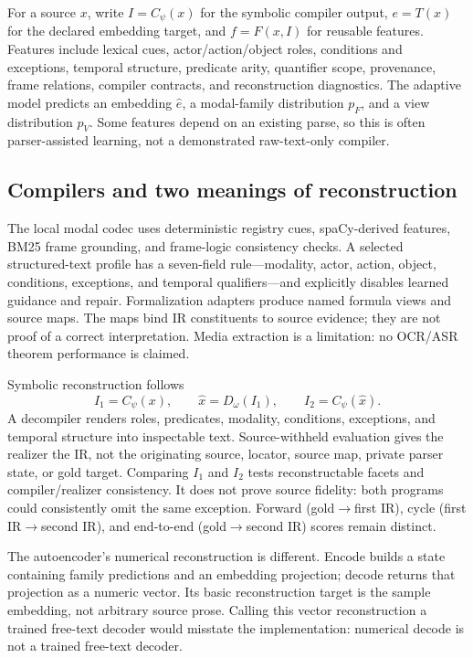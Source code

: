 \documentclass{article}
\begin{document}
For a source $x$, write $I=C_\psi(x)$ for the symbolic compiler output, $e=T(x)$ for the declared embedding target, and $f=F(x,I)$ for reusable features. Features include lexical cues, actor/action/object roles, conditions and exceptions, temporal structure, predicate arity, quantifier scope, provenance, frame relations, compiler contracts, and reconstruction diagnostics. The adaptive model predicts an embedding $\hat e$, a modal-family distribution $p_F$, and a view distribution $p_V$. Some features depend on an existing parse, so this is often parser-assisted learning, not a demonstrated raw-text-only compiler.

\subsection{Compilers and two meanings of reconstruction}
The local modal codec uses deterministic registry cues, spaCy-derived features, BM25 frame grounding, and frame-logic consistency checks. A selected structured-text profile has a seven-field rule---modality, actor, action, object, conditions, exceptions, and temporal qualifiers---and explicitly disables learned guidance and repair. Formalization adapters produce named formula views and source maps. The maps bind IR constituents to source evidence; they are not proof of a correct interpretation. Media extraction is a limitation: no OCR/ASR theorem performance is claimed.



Symbolic reconstruction follows
\begin{equation}
I_1=C_\psi(x),\qquad \hat{x}=D_\omega(I_1),\qquad I_2=C_\psi(\hat{x}).
\label{eq:cycle}
\end{equation}
A decompiler renders roles, predicates, modality, conditions, exceptions, and temporal structure into inspectable text. Source-withheld evaluation gives the realizer the IR, not the originating source, locator, source map, private parser state, or gold target. Comparing $I_1$ and $I_2$ tests reconstructable facets and compiler/realizer consistency. It does not prove source fidelity: both programs could consistently omit the same exception. Forward (gold$\to$first IR), cycle (first IR$\to$second IR), and end-to-end (gold$\to$second IR) scores remain distinct.

The autoencoder's numerical reconstruction is different. Encode builds a state containing family predictions and an embedding projection; decode returns that projection as a numeric vector. Its basic reconstruction target is the sample embedding, not arbitrary source prose. Calling this vector reconstruction a trained free-text decoder would misstate the implementation: numerical decode is not a trained free-text decoder.
\end{document}
